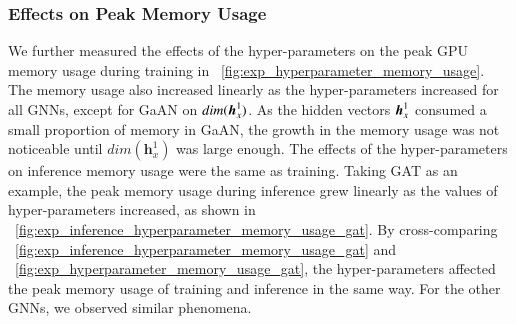 \subsubsection{Effects on Peak Memory Usage}

We further measured the effects of the hyper-parameters on the peak GPU memory usage during training in \figurename~\ref{fig:exp_hyperparameter_memory_usage}.
%
The memory usage also increased linearly as the hyper-parameters increased for all GNNs, except for GaAN on $dim(\boldsymbol{h}^1_x)$.
%
As the hidden vectors $\boldsymbol{h}^1_x$ consumed a small proportion of memory in GaAN, the growth in the memory usage was not noticeable until $dim(\boldsymbol{h}^1_x)$ was large enough.
%
The effects of the hyper-parameters on inference memory usage were the same as training.
%
Taking GAT as an example, the peak memory usage during inference grew linearly as the values of hyper-parameters increased, as shown in \figurename~\ref{fig:exp_inference_hyperparameter_memory_usage_gat}.
%
By cross-comparing \figurename~\ref{fig:exp_inference_hyperparameter_memory_usage_gat} and \figurename~\ref{fig:exp_hyperparameter_memory_usage_gat}, the hyper-parameters affected the peak memory usage of training and inference in the same way.
%
For the other GNNs, we observed similar phenomena.

